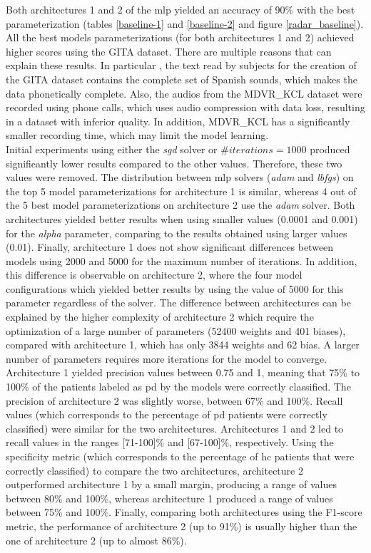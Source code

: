 Both architectures 1 and 2 of the \gls{mlp} yielded an accuracy of 90\% with the best parameterization (tables \ref{baseline-1} and \ref{baseline-2} and figure \ref{radar_baseline}). \\
All the best models parameterizations (for both architectures 1 and 2) achieved higher scores using the GITA dataset. There are multiple reasons that can explain these results. In particular , the text read by subjects for the creation of the GITA dataset contains the complete set of Spanish sounds, which makes the data phonetically complete. Also, the audios from the MDVR\_KCL dataset were recorded using phone calls, which uses audio compression with data loss, resulting in a dataset with inferior quality. In addition, MDVR\_KCL has a significantly smaller recording time, which may limit the model learning. \\
Initial experiments using either the \textit{sgd} solver or $\#iterations = 1000$ produced significantly lower results compared to the other values. Therefore, these two values were removed. The distribution between \gls{mlp} solvers (\textit{adam} and \textit{lbfgs}) on the top 5 model parameterizations for architecture 1 is similar, whereas 4 out of the 5 best model parameterizations on architecture 2 use the \textit{adam} solver. Both architectures yielded better results when using smaller values (0.0001 and 0.001) for the \textit{alpha} parameter, comparing to the results obtained using larger values (0.01). Finally, architecture 1 does not show significant differences between models using 2000 and 5000 for the maximum number of iterations. In addition, this difference is observable on architecture 2, where the four model configurations which yielded better results by using the value of 5000 for this parameter regardless of the solver. The difference between architectures can be explained by the higher complexity of architecture 2 which require the optimization of a large number of parameters (52400 weights and 401 biases), compared with architecture 1, which has only 3844 weights and 62 bias. A larger number of parameters requires more iterations for the model to converge. \\
Architecture 1 yielded precision values between 0.75 and 1, meaning that 75\% to 100\% of the patients labeled as \gls{pd} by the models were correctly classified. The precision of architecture 2 was slightly worse, between 67\% and 100\%. Recall values (which corresponds to the percentage of \gls{pd} patients were correctly classified) were similar for the two architectures. Architectures 1 and 2 led to recall values in the ranges [71-100]\% and [67-100]\%, respectively. Using the specificity metric (which corresponds to the percentage of \gls{hc} patients that were correctly classified) to compare the two architectures, architecture 2 outperformed architecture 1 by a small margin, producing a range of values between 80\% and 100\%, whereas architecture 1 produced a range of values between 75\% and 100\%. Finally, comparing both architectures using the F1-score metric, the performance of architecture 2 (up to 91\%) is usually higher than the one of architecture 2 (up to almost 86\%). \\
